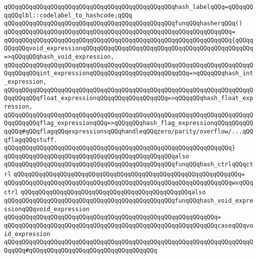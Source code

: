 \verb|qQQqqQQqqQQqqQQqqQQqqQQqqQQqqQQqqQQqqQQqqQQqqQQqhash_labelqQQq=qQQqqQQqqQQqlbl::codelabel_to_hashcode;qQQq|\newline
\newline
\verb|qQQqqQQqqQQqqQQqqQQqqQQqqQQqqQQqqQQqqQQqqQQqqQQqfunqQQqhasherqQQq()|\newline
\verb|qQQqqQQqqQQqqQQqqQQqqQQqqQQqqQQqqQQqqQQqqQQqqQQqqQQqqQQqqQQqqQQq=|\newline
\verb|qQQqqQQqqQQqqQQqqQQqqQQqqQQqqQQqqQQqqQQqqQQqqQQqqQQqqQQqqQQqqQQq{qQQqqQQqqQQqvoid_expressionqQQqqQQqqQQqqQQqqQQqqQQqqQQqqQQqqQQqqQQqqQQqqQQq=>qQQqqQQqhash_void_expression,|\newline
\verb|qQQqqQQqqQQqqQQqqQQqqQQqqQQqqQQqqQQqqQQqqQQqqQQqqQQqqQQqqQQqqQQqqQQqqQQqqQQqqQQqint_expressionqQQqqQQqqQQqqQQqqQQqqQQqqQQq=>qQQqqQQqhash_int_expression,|\newline
\verb|qQQqqQQqqQQqqQQqqQQqqQQqqQQqqQQqqQQqqQQqqQQqqQQqqQQqqQQqqQQqqQQqqQQqqQQqqQQqqQQqfloat_expressionqQQqqQQqqQQqqQQqqQQq=>qQQqqQQqhash_float_expression,|\newline
\verb|qQQqqQQqqQQqqQQqqQQqqQQqqQQqqQQqqQQqqQQqqQQqqQQqqQQqqQQqqQQqqQQqqQQqqQQqqQQqqQQqflag_expressionqQQq=>qQQqqQQqhash_flag_expressionqQQqqQQqqQQqqQQq#qQQqflagqQQqexpressionsqQQqhandleqQQqzero/parity/overflow/...qQQqflagqQQqstuff.|\newline
\verb|qQQqqQQqqQQqqQQqqQQqqQQqqQQqqQQqqQQqqQQqqQQqqQQqqQQqqQQqqQQqqQQq}|\newline
\newline
\verb|qQQqqQQqqQQqqQQqqQQqqQQqqQQqqQQqqQQqqQQqqQQqqQQqalso|\newline
\verb|qQQqqQQqqQQqqQQqqQQqqQQqqQQqqQQqqQQqqQQqqQQqqQQqfunqQQqhash_ctrlqQQqctrl|\newline
\verb|qQQqqQQqqQQqqQQqqQQqqQQqqQQqqQQqqQQqqQQqqQQqqQQqqQQqqQQqqQQqqQQq=|\newline
\verb|qQQqqQQqqQQqqQQqqQQqqQQqqQQqqQQqqQQqqQQqqQQqqQQqqQQqqQQqqQQqqQQqwvqQQqctrl|\newline
\newline
\verb|qQQqqQQqqQQqqQQqqQQqqQQqqQQqqQQqqQQqqQQqqQQqqQQqalso|\newline
\verb|qQQqqQQqqQQqqQQqqQQqqQQqqQQqqQQqqQQqqQQqqQQqqQQqfunqQQqhash_void_expressionqQQqvoid_expression|\newline
\verb|qQQqqQQqqQQqqQQqqQQqqQQqqQQqqQQqqQQqqQQqqQQqqQQqqQQqqQQqqQQq=|\newline
\verb|qQQqqQQqqQQqqQQqqQQqqQQqqQQqqQQqqQQqqQQqqQQqqQQqqQQqqQQqqQQqcaseqQQqvoid_expression|\newline
\verb|qQQqqQQqqQQqqQQqqQQqqQQqqQQqqQQqqQQqqQQqqQQqqQQqqQQqqQQqqQQqqQQqqQQqqQQqqQQq#qQQqqQQqqQQqqQQqqQQqqQQqqQQqqQQqqQQq|\newline
